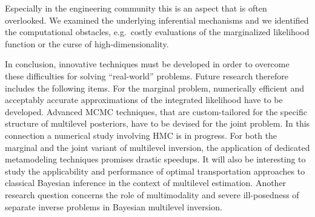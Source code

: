 Especially in the engineering community this is an aspect that is often overlooked.
We examined the underlying inferential mechanisms and we identified the computational obstacles, e.g.\ costly evaluations of the marginalized likelihood function or the curse of high-dimensionality.
\par %
In conclusion, innovative techniques must be developed in order to overcome these difficulties for solving ``real-world'' problems.
Future research therefore includes the following items.
For the marginal problem, numerically efficient and acceptably accurate approximations of the integrated likelihood have to be developed.
Advanced MCMC techniques, that are custom-tailored for the specific structure of multilevel posteriors, have to be devised for the joint problem.
In this connection a numerical study involving HMC is in progress.
For both the marginal and the joint variant of multilevel inversion, the application of dedicated metamodeling techniques promises drastic speedups.
It will also be interesting to study the applicability and performance of optimal transportation approaches \cite{Mapping:Reich2011,Mapping:ElMoselhy2012} to classical Bayesian inference in the context of multilevel estimation.
Another research question concerns the role of multimodality and severe ill-posedness of separate inverse problems in Bayesian multilevel inversion.